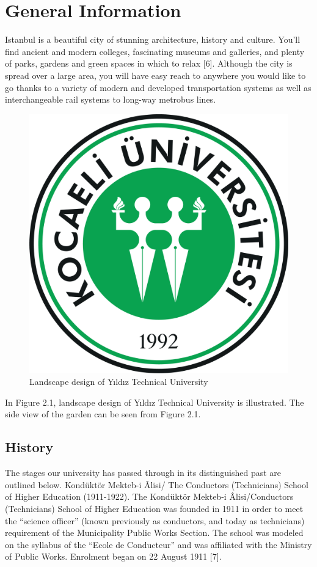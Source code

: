 \chapter{General Information}
Istanbul is a beautiful city of stunning architecture, history and culture. You'll find ancient and modern colleges, fascinating museums and galleries, and plenty of parks, gardens and green spaces in which to relax [6]. Although the city is spread over a large area, you will have easy reach to anywhere you would like to go thanks to a variety of modern and developed transportation systems as well as interchangeable rail systems to long-way metrobus lines.

\begin{figure}[!htbp]
\centering
\includegraphics[width=\textwidth]{thesisChapters/images/Picture1.png}
\caption{Landscape design of Yıldız Technical University}
\end{figure}

In Figure 2.1, landscape design of Yıldız Technical University is illustrated. The side view of the garden can be seen from Figure 2.1.

\section{History}
The stages our university has passed through in its distinguished past are outlined below. Kondüktör Mekteb-i Âlisi/ The Conductors (Technicians) School of Higher Education (1911-1922). The Kondüktör Mekteb-i Âlisi/Conductors (Technicians) School of Higher Education was founded in 1911 in order to meet the “science officer” (known previously as conductors, and today as technicians) requirement of the Municipality Public Works Section. The school was modeled on the syllabus of the “Ecole de Conducteur” and was affiliated with the Ministry of Public Works. Enrolment began on 22 August 1911 [7].

